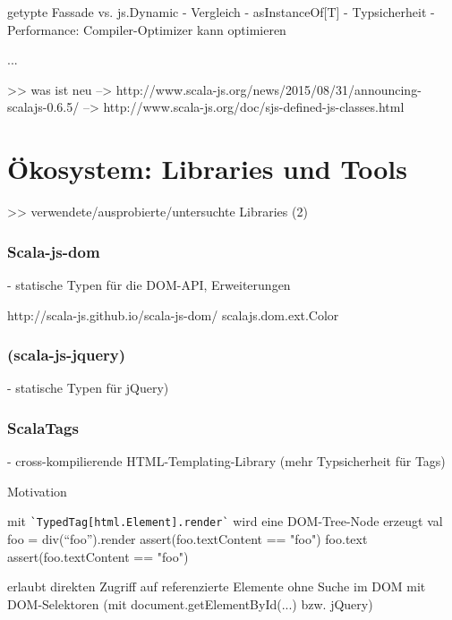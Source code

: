 \documentclass[a4paper, 12pt, hidelinks, listof=totoc, listoftables=totoc, bibliography=totoc]{scrreprt}
\begin{document}
getypte Fassade vs. js.Dynamic
- Vergleich
- asInstanceOf[T]
  - Typsicherheit
  - Performance: Compiler-Optimizer kann optimieren

...






>> was ist neu
  -->  http://www.scala-js.org/news/2015/08/31/announcing-scalajs-0.6.5/
  -->  http://www.scala-js.org/doc/sjs-defined-js-classes.html






\section{Ökosystem: Libraries und Tools}

>> verwendete/ausprobierte/untersuchte Libraries (2)

\subsubsection{Scala-js-dom}

- statische Typen für die DOM-API, Erweiterungen

http://scala-js.github.io/scala-js-dom/
scalajs.dom.ext.Color

\subsubsection{(scala-js-jquery)}

- statische Typen für jQuery)

\subsubsection{ScalaTags}

- cross-kompilierende HTML-Templating-Library (mehr Typsicherheit für Tags)

Motivation



mit \texttt{\`{}TypedTag[html.Element].render\`} wird eine DOM-Tree-Node erzeugt
  val foo = div("`foo"').render
  assert(foo.textContent == "foo")
  foo.text
  assert(foo.textContent == "foo")

erlaubt direkten Zugriff auf referenzierte Elemente ohne Suche im DOM mit DOM-Selektoren (mit document.getElementById(...) bzw. jQuery)
\end{document}
